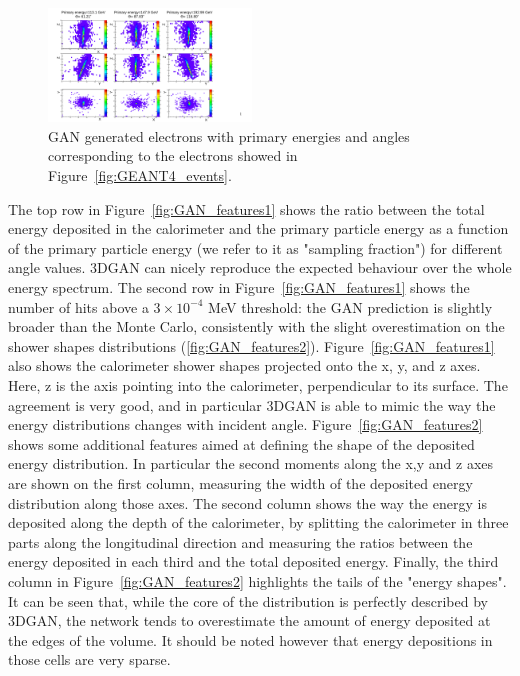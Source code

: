 \begin{figure}[htbp]
    \includegraphics[width=0.48\textwidth]{Images/Calo/GAN_gan_events.pdf}
    \caption{GAN generated electrons with primary energies and angles corresponding to the electrons showed in Figure~\ref{fig:GEANT4_events}.}
    \label{fig:GAN_events}
\end{figure}

The top row in Figure~\ref{fig:GAN_features1} shows the ratio between the total energy deposited in the calorimeter and the primary particle energy as a function of the primary particle energy (we refer to it as "sampling fraction") for different angle values. 3DGAN can nicely reproduce the expected behaviour over the whole energy spectrum. The second row in Figure~\ref{fig:GAN_features1} shows the number of hits above a $3 \times 10^{-4}$ MeV threshold: the GAN prediction is slightly broader than the Monte Carlo, consistently with the slight overestimation on the shower shapes distributions (\ref{fig:GAN_features2}).  Figure~\ref{fig:GAN_features1} also shows the calorimeter shower shapes projected onto the x, y, and z axes. Here, z is the axis pointing into the calorimeter, perpendicular to its surface. The agreement is very good, and in particular 3DGAN is able to mimic the way the energy distributions changes with incident angle. 
Figure~\ref{fig:GAN_features2} shows some additional features aimed at defining the shape of the deposited energy distribution. In particular the second moments along the x,y and z axes are shown on the first column, measuring the width of the deposited energy distribution along those axes. The second column shows the way the energy is deposited along the depth of the calorimeter, by splitting the calorimeter in three parts along the longitudinal direction and measuring the ratios between the energy deposited in each third  and the total deposited energy. Finally, the third column in Figure~\ref{fig:GAN_features2} highlights the tails of the "energy shapes". It can be seen that, while the core of the distribution is perfectly described by 3DGAN, the network tends to overestimate the amount of energy deposited at the edges of the volume. It should be noted however that energy depositions in those cells are very sparse. 
